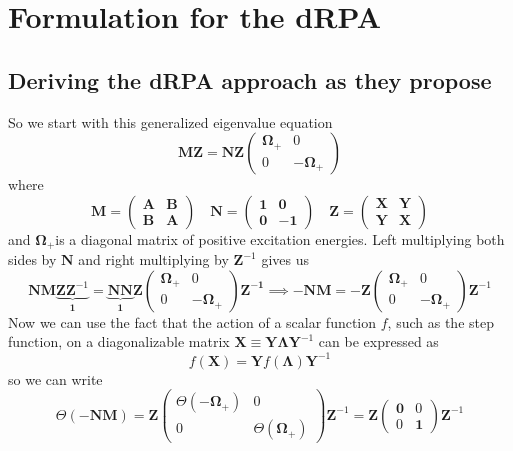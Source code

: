 \section{Formulation for the dRPA}
\subsection{Deriving the dRPA approach as they propose}
So we start with this generalized eigenvalue equation
$$
\mathbf{M}\bm{Z}=\mathbf{N}\bm{Z}\left(\begin{array}{cc}
\boldsymbol{\Omega}_{+} & 0 \\
0 & -\boldsymbol{\Omega}_{+}
\end{array}\right)
$$
where
$$
\mathbf{M} =\left(\begin{array}{ll}
\mathbf{A} & \mathbf{B} \\
\mathbf{B} & \mathbf{A}
\end{array}\right) \quad 
\mathbf{N} =\left(\begin{array}{cc}
\mathbf{1} & \mathbf{0} \\
\mathbf{0} & -\mathbf{1}
\end{array}\right) \quad
\bm{Z} =\left(\begin{array}{ll}
\bm{X} & \bm{Y} \\
\bm{Y} & \bm{X}
\end{array}\right)
$$
and $\boldsymbol{\Omega}_{+}$is a diagonal matrix of positive excitation energies. Left multiplying both sides by $\bm{N}$ and right multiplying by $\bm{Z}^{-1}$ gives us
\begin{equation}
    \bm{N}\bm{M}\underbrace{\bm{Z} \bm{Z}^{-1}}_{\bm{1}} = \underbrace{\bm{N}\bm{N}}_{\bm{1}}\bm{Z}\left(\begin{array}{cc}
\boldsymbol{\Omega}_{+} & 0 \\
0 & -\boldsymbol{\Omega}_{+}
\end{array}\right) \bm{Z^{-1}} \implies - \bm{N}\bm{M} = -\bm{Z}\left(\begin{array}{cc}\boldsymbol{\Omega}_{+} & 0 \\
0 & -\boldsymbol{\Omega}_{+}
\end{array}\right)\bm{Z}^{-1}
\end{equation}
Now we can use the fact that the action of a scalar function $f$, such as the step function, on a diagonalizable matrix $\bm{X} \equiv \bm{Y} \bm{\Lambda} \bm{Y}^{-1}$ can be expressed as
$$
f(\bm{X}) = \bm{Y} f(\bm{\Lambda}) \bm{Y}^{-1}
$$
so we can write
\begin{equation}
    \Theta(-\bm{N}\bm{M}) = \bm{Z} \left(\begin{array}{cc}\Theta(-\boldsymbol{\Omega}_{+}) & 0 \\ 0 & \Theta(\boldsymbol{\Omega}_{+})\end{array}\right)\bm{Z}^{-1} = \bm{Z} \left(\begin{array}{cc}\bm{0} & 0 \\ 0 & \bm{1}\end{array}\right)\bm{Z}^{-1}
\end{equation}
